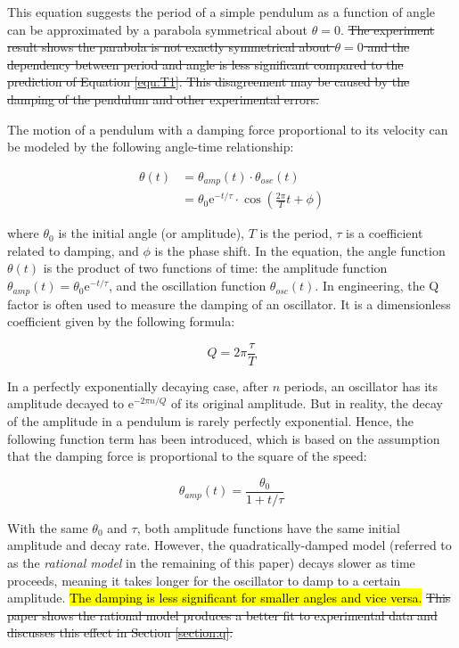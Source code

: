 \documentclass[12pt]{article}
\newcommand{\e}{\mathrm{e}}
\DeclareRobustCommand{\hlnew}[1]{{\sethlcolor{hlcnew}\hl{#1}}}
\DeclareRobustCommand{\hldel}[1]{{\st{#1}}}
\begin{document}
This equation suggests the period of a simple pendulum as a function of angle can be approximated by a parabola symmetrical about $\theta=0$. \hldel{The experiment result shows the parabola is not exactly symmetrical about $\theta=0$ and the dependency between period and angle is less significant compared to the prediction of Equation {\ref{equ:T1}}. This disagreement may be caused by the damping of the pendulum and other experimental errors.}

The motion of a pendulum with a damping force proportional to its velocity can be modeled by the following angle-time relationship: ~\cite{hyperphysics-oscda}

\begin{equation}
\label{equ:damped-osc}
\begin{aligned}
\theta(t)
&= \theta_{amp}(t) \cdot \theta_{osc}(t) \\
&= \theta_0 \e^{-t/\tau} \cdot \cos\left(\frac{2\pi}{T}t+\phi\right)
\end{aligned}
\end{equation}

where $\theta_0$ is the initial angle (or amplitude), $T$ is the period, $\tau$ is a coefficient related to damping, and $\phi$ is the phase shift. In the equation, the angle function $\theta(t)$ is the product of two functions of time: the amplitude function $\theta_{amp}(t)=\theta_0\e^{-t/\tau}$, and the oscillation function $\theta_{osc}(t)$. In engineering, the Q factor is often used to measure the damping of an oscillator. It is a dimensionless coefficient given by the following formula: ~\cite{wikipedia-q}

\begin{equation}
\label{equ:q}
Q=2\pi\frac{\tau}{T}
\end{equation}

In a perfectly exponentially decaying case, after $n$ periods, an oscillator has its amplitude decayed to $\e^{-2\pi n/Q}$ of its original amplitude. But in reality, the decay of the amplitude in a pendulum is rarely perfectly exponential. Hence, the following function term has been introduced, which is based on the assumption that the damping force is proportional to the square of the speed: ~\cite{quadratic-damp}

\begin{equation}
\label{equ:quadratic-damp}
\theta_{amp}(t) = \frac{\theta_0}{1+t/\tau}
\end{equation}

With the same $\theta_0$ and $\tau$, both amplitude functions have the same initial amplitude and decay rate. However, the quadratically-damped model (referred to as the \textit{rational model} in the remaining of this paper) decays slower as time proceeds, meaning it takes longer for the oscillator to damp to a certain amplitude. \hlnew{The damping is less significant for smaller angles and vice versa.} \hldel{This paper shows the rational model produces a better fit to experimental data and discusses this effect in Section {\ref{section:q}}.}
\end{document}
